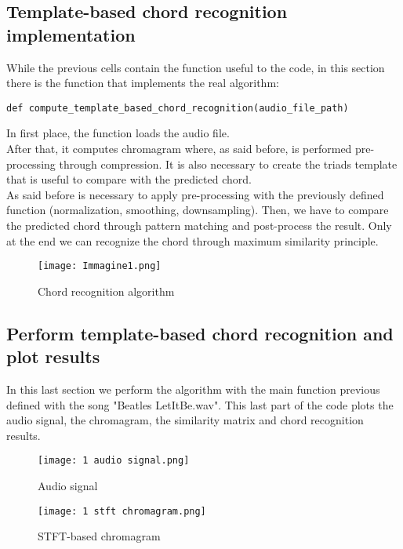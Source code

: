 \documentclass{article}
\begin{document}
\subsection{Template-based chord recognition implementation}

While the previous cells contain the function useful to the code, in this section there is the function that implements the real algorithm:\\

\begin{lstlisting}
def compute_template_based_chord_recognition(audio_file_path)
\end{lstlisting}
In first place, the function loads the audio file.\\ After that, it computes chromagram where, as said before, is performed pre-processing through compression. It is also necessary to create the triads template that is useful to compare with the predicted chord.\\
As said before is necessary to apply pre-processing with the previously defined function (normalization, smoothing, downsampling).
Then, we have to compare the predicted chord through pattern matching and post-process the result.
Only at the end we can recognize the chord through maximum similarity principle.\\

\begin{figure} [H]
 \centering
 \texttt{[image: Immagine1.png]}
 \caption{Chord recognition algorithm}
\end{figure}

\subsection{Perform template-based chord recognition and plot results}

In this last section we perform the algorithm with the main function previous defined with the song "Beatles LetItBe.wav". This last part of the code plots the audio signal, the chromagram, the  similarity matrix and chord recognition results.\\

\begin{figure} [H]
 \centering
 \texttt{[image: 1 audio signal.png]}
 \caption{Audio signal}
\end{figure}

\begin{figure} [H]
 \centering
 \texttt{[image: 1 stft chromagram.png]}
 \caption{STFT-based chromagram}
\end{figure}
\end{document}
